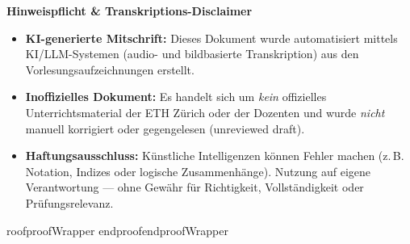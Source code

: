 \documentclass[11pt,a4paper]{report}
\theoremstyle{purplethm}
\theoremstyle{defthm}
\theoremstyle{examplethm}
\theoremstyle{remarkthm}
\theoremstyle{questionthm}
\theoremstyle{answerthm}
\theoremstyle{importantremarkthm}
\theoremstyle{purplethm}
\newcommand{\AliasEnv}[2]{%
  \expandafter\let\csname #1\expandafter\endcsname\csname #2\endcsname
  \expandafter\let\csname end#1\expandafter\endcsname\csname end#2\endcsname
}
\newcommand{\OldProofVocabulary}{\AliasEnv{proof}{proofWrapper}}
\begin{document}
\begin{titlepage}
\begin{minipage}{\textwidth}
\begin{tcolorbox}[
        arc=6pt,
        boxrule=0.7pt,
        colback=MidnightBlue!3!white,
        colframe=MidnightBlue!30!white,
        left=10pt, right=10pt, top=8pt, bottom=8pt
    ]
    {\sffamily\bfseries\small\color{MidnightBlue!90!black}\faInfoCircle\quad Hinweispflicht \& Transkriptions-Disclaimer \par}
    \vspace{0.25cm}
    \sffamily\small\color{black!75}
    \begin{itemize}[leftmargin=1.5em, itemsep=3pt, topsep=0pt, parsep=0pt]
        \item[\textcolor{MidnightBlue!80!black}{\small\faRobot}] \textbf{KI-generierte Mitschrift:} Dieses Dokument wurde automatisiert mittels KI/LLM-Systemen (audio- und bildbasierte Transkription) aus den Vorlesungsaufzeichnungen erstellt.
        \item[\textcolor{MidnightBlue!80!black}{\small\faUserShield}] \textbf{Inoffizielles Dokument:} Es handelt sich um \emph{kein} offizielles Unterrichtsmaterial der ETH Zürich oder der Dozenten und wurde \emph{nicht} manuell korrigiert oder gegengelesen (unreviewed draft).
        \item[\textcolor{MidnightBlue!80!black}{\small\faExclamationTriangle}] \textbf{Haftungsausschluss:} Künstliche Intelligenzen können Fehler machen (z.\,B. Notation, Indizes oder logische Zusammenhänge). Nutzung auf eigene Verantwortung --- ohne Gewähr für Richtigkeit, Vollständigkeit oder Prüfungsrelevanz.
    \end{itemize}
    \end{tcolorbox}
\end{minipage}
\vspace*{0.5cm}
\end{titlepage}
\hypersetup{pageanchor=true}

\cleardoublepage
{}
\tableofcontents
\cleardoublepage


\OldProofVocabulary














\end{document}
